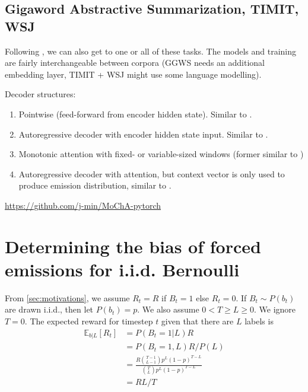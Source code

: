 \documentclass{article}
\begin{document}
\subsection{Gigaword Abstractive Summarization, TIMIT, WSJ}

Following \citet{raffelOnlineLineartimeAttention2017}, we can also get to
one or all of these tasks. The models and training are fairly interchangeable
between corpora (GGWS needs an additional embedding layer, TIMIT + WSJ might
use some language modelling).

Decoder structures:
%
\begin{enumerate}
    \item Pointwise (feed-forward from encoder hidden state). Similar to
          \citet{luoLearningOnlineAlignments2017,lawsonLearningHardAlignments2018}.
    \item Autoregressive decoder with encoder hidden state input. Similar to
          \citet{raffelOnlineLineartimeAttention2017}.
    \item Monotonic attention with fixed- or variable-sized windows
          (former similar to \citet{chiuMonotonicChunkwiseAttention2018})
    \item Autoregressive decoder with attention, but context vector is only
          used to produce emission distribution, similar to
          \citet{wuHardNonmonotonicAttention2018,wuExactHardMonotonic2019}.
\end{enumerate}
%

\url{https://github.com/j-min/MoChA-pytorch}




\appendix

\section{Determining the bias of forced emissions for i.i.d. Bernoulli}

From \cref{sec:motivations}, we assume $R_t = R$ if $B_t = 1$ else $R_t = 0$.
If $B_t \sim P(b_t)$ are drawn i.i.d., then let $P(b_t) = p$. We also assume $0
< T \geq L \geq 0$. We ignore $T = 0$. The expected reward for timestep $t$
given that there are $L$ labels is
%
\begin{equation} \label{eq:iid_unbiased}
\begin{split}
    \mathbb{E}_{b|L}[R_t]
        &= P(B_t=1|L)R \\
        &= P(B_t=1, L) R / P(L) \\
        &= \frac{R\binom{T - 1}{L - 1} p^L (1 - p)^{T - L}}
                {\binom{T}{L}p^L (1 - p)^{T - L}} \\
        &= RL / T
\end{split}
\end{equation}
\end{document}
